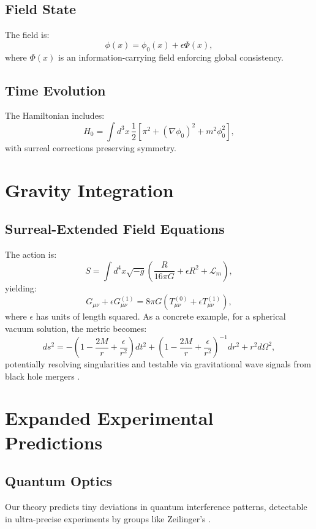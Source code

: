 \documentclass{article}
\begin{document}
\subsection{Field State}
The field is:
\begin{equation}
\phi(x) = \phi_0(x) + \epsilon \Phi(x),
\end{equation}
where \(\Phi(x)\) is an information-carrying field enforcing global consistency.

\subsection{Time Evolution}
The Hamiltonian includes:
\begin{equation}
H_0 = \int d^3x \, \frac{1}{2} [\pi^2 + (\nabla \phi_0)^2 + m^2 \phi_0^2],
\end{equation}
with surreal corrections preserving symmetry.

\section{Gravity Integration}
\subsection{Surreal-Extended Field Equations}
The action is:
\begin{equation}
S = \int d^4x \sqrt{-g} \left( \frac{R}{16\pi G} + \epsilon R^2 + \mathcal{L}_m \right),
\end{equation}
yielding:
\begin{equation}
G_{\mu\nu} + \epsilon G_{\mu\nu}^{(1)} = 8\pi G \left( T_{\mu\nu}^{(0)} + \epsilon T_{\mu\nu}^{(1)} \right),
\end{equation}
where \(\epsilon\) has units of length squared. As a concrete example, for a spherical vacuum solution, the metric becomes:
\begin{equation}
ds^2 = -\left(1 - \frac{2M}{r} + \frac{\epsilon}{r^2}\right) dt^2 + \left(1 - \frac{2M}{r} + \frac{\epsilon}{r^2}\right)^{-1} dr^2 + r^2 d\Omega^2,
\end{equation}
potentially resolving singularities and testable via gravitational wave signals from black hole mergers \cite{LIGO2016}.

\section{Expanded Experimental Predictions}
\subsection{Quantum Optics}
Our theory predicts tiny deviations in quantum interference patterns, detectable in ultra-precise experiments by groups like Zeilinger’s \cite{Zeilinger2017}.
\end{document}
